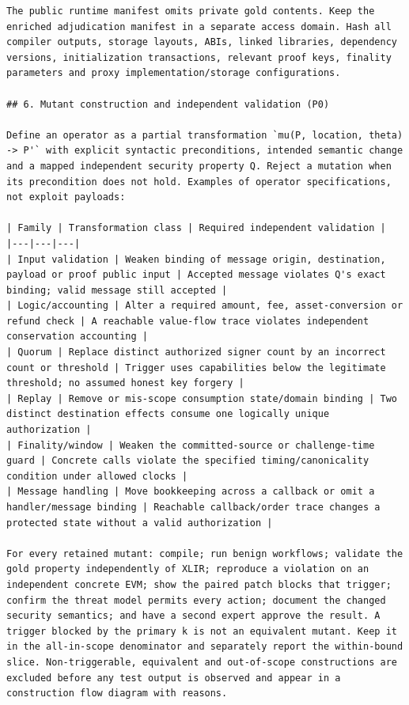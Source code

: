 \documentclass[11pt,a4paper]{article}
\begin{document}
\begin{verbatim}
The public runtime manifest omits private gold contents. Keep the enriched adjudication manifest in a separate access domain. Hash all compiler outputs, storage layouts, ABIs, linked libraries, dependency versions, initialization transactions, relevant proof keys, finality parameters and proxy implementation/storage configurations.

## 6. Mutant construction and independent validation (P0)

Define an operator as a partial transformation `mu(P, location, theta) -> P'` with explicit syntactic preconditions, intended semantic change and a mapped independent security property Q. Reject a mutation when its precondition does not hold. Examples of operator specifications, not exploit payloads:

| Family | Transformation class | Required independent validation |
|---|---|---|
| Input validation | Weaken binding of message origin, destination, payload or proof public input | Accepted message violates Q's exact binding; valid message still accepted |
| Logic/accounting | Alter a required amount, fee, asset-conversion or refund check | A reachable value-flow trace violates independent conservation accounting |
| Quorum | Replace distinct authorized signer count by an incorrect count or threshold | Trigger uses capabilities below the legitimate threshold; no assumed honest key forgery |
| Replay | Remove or mis-scope consumption state/domain binding | Two distinct destination effects consume one logically unique authorization |
| Finality/window | Weaken the committed-source or challenge-time guard | Concrete calls violate the specified timing/canonicality condition under allowed clocks |
| Message handling | Move bookkeeping across a callback or omit a handler/message binding | Reachable callback/order trace changes a protected state without a valid authorization |

For every retained mutant: compile; run benign workflows; validate the gold property independently of XLIR; reproduce a violation on an independent concrete EVM; show the paired patch blocks that trigger; confirm the threat model permits every action; document the changed security semantics; and have a second expert approve the result. A trigger blocked by the primary k is not an equivalent mutant. Keep it in the all-in-scope denominator and separately report the within-bound slice. Non-triggerable, equivalent and out-of-scope constructions are excluded before any test output is observed and appear in a construction flow diagram with reasons.


\end{verbatim}
\end{document}
